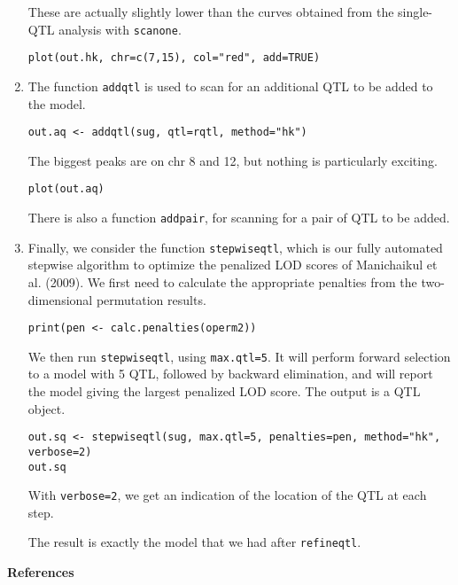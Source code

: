 \documentclass[10pt,letterpaper]{article}
\newcommand{\usercolor}{\color [named]{BlueViolet}}
\begin{document}
\begin{enumerate}
These are actually slightly lower than the curves obtained from
the single-QTL analysis with \verb-scanone-.

\usercolor
\verb|plot(out.hk, chr=c(7,15), col="red", add=TRUE)|
\normalcolor

\item The function \verb-addqtl- is used to scan for an additional QTL
  to be added to the model.

\usercolor
\verb|out.aq <- addqtl(sug, qtl=rqtl, method="hk")|
\normalcolor

The biggest peaks are on chr 8 and 12, but nothing is particularly
exciting.

\usercolor
\verb|plot(out.aq)|
\normalcolor

There is also a function \verb-addpair-, for scanning for a pair of
QTL to be added.


\item Finally, we consider the function \verb-stepwiseqtl-, which is
  our fully automated stepwise algorithm to optimize the penalized LOD
  scores of Manichaikul et al. (2009).  We first need to calculate the
  appropriate penalties from the two-dimensional permutation results.

\usercolor
\verb|print(pen <- calc.penalties(operm2))|
\normalcolor

We then run \verb-stepwiseqtl-, using \verb-max.qtl=5-.  It will
perform forward selection to a model with 5 QTL, followed by backward
elimination, and will report the model giving the largest penalized
LOD score.  The output is a QTL object.

\usercolor
\verb|out.sq <- stepwiseqtl(sug, max.qtl=5, penalties=pen, method="hk", verbose=2)| \\
\verb|out.sq|
\normalcolor

With \verb-verbose=2-, we get an indication of the location of the QTL
at each step.  

The result is exactly the model that we had after \verb-refineqtl-.

\end{enumerate}



\vspace{12pt}
\textbf{References} \vspace{6pt}
\nopagebreak
\end{document}

